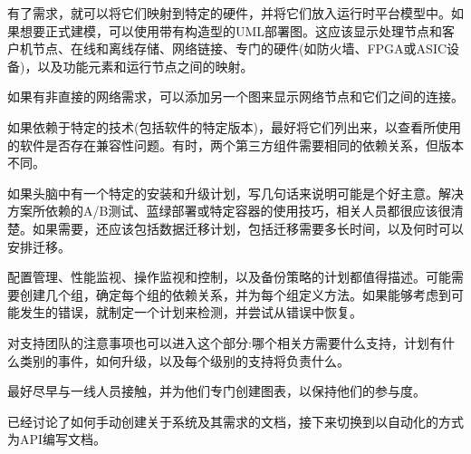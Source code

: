 有了需求，就可以将它们映射到特定的硬件，并将它们放入运行时平台模型中。如果想要正式建模，可以使用带有构造型的UML部署图。这应该显示处理节点和客户机节点、在线和离线存储、网络链接、专门的硬件(如防火墙、FPGA或ASIC设备)，以及功能元素和运行节点之间的映射。

如果有非直接的网络需求，可以添加另一个图来显示网络节点和它们之间的连接。

如果依赖于特定的技术(包括软件的特定版本)，最好将它们列出来，以查看所使用的软件是否存在兼容性问题。有时，两个第三方组件需要相同的依赖关系，但版本不同。

如果头脑中有一个特定的安装和升级计划，写几句话来说明可能是个好主意。解决方案所依赖的A/B测试、蓝绿部署或特定容器的使用技巧，相关人员都很应该很清楚。如果需要，还应该包括数据迁移计划，包括迁移需要多长时间，以及何时可以安排迁移。

配置管理、性能监视、操作监视和控制，以及备份策略的计划都值得描述。可能需要创建几个组，确定每个组的依赖关系，并为每个组定义方法。如果能够考虑到可能发生的错误，就制定一个计划来检测，并尝试从错误中恢复。

对支持团队的注意事项也可以进入这个部分:哪个相关方需要什么支持，计划有什么类别的事件，如何升级，以及每个级别的支持将负责什么。

最好尽早与一线人员接触，并为他们专门创建图表，以保持他们的参与度。

已经讨论了如何手动创建关于系统及其需求的文档，接下来切换到以自动化的方式为API编写文档。









